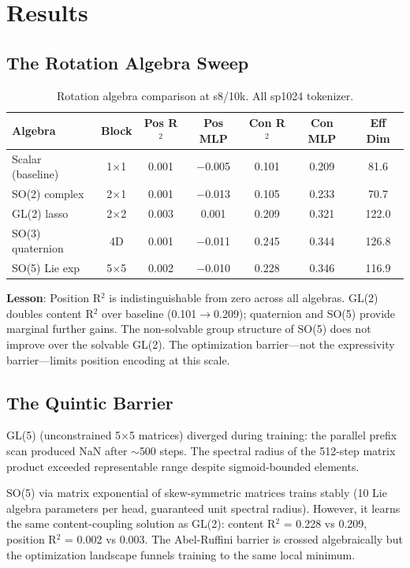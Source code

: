 \documentclass[11pt,a4paper]{article}
\begin{document}
\section{Results}

\subsection{The Rotation Algebra Sweep}

\begin{table}[h]
\centering
\caption{Rotation algebra comparison at s8/10k. All sp1024 tokenizer.}
\begin{tabular}{lcccccc}
\toprule
Algebra & Block & Pos R$^2$ & Pos MLP & Con R$^2$ & Con MLP & Eff Dim \\
\midrule
Scalar (baseline) & 1$\times$1 & 0.001 & $-$0.005 & 0.101 & 0.209 & 81.6 \\
SO(2) complex & 2$\times$1 & 0.001 & $-$0.013 & 0.105 & 0.233 & 70.7 \\
GL(2) lasso & 2$\times$2 & 0.003 & 0.001 & 0.209 & 0.321 & 122.0 \\
SO(3) quaternion & 4D & 0.001 & $-$0.011 & 0.245 & 0.344 & 126.8 \\
SO(5) Lie exp & 5$\times$5 & 0.002 & $-$0.010 & 0.228 & 0.346 & 116.9 \\
\bottomrule
\end{tabular}
\label{tab:algebra}
\end{table}

\textbf{Lesson}: Position R$^2$ is indistinguishable from zero across all algebras. GL(2) doubles content R$^2$ over baseline (0.101$\to$0.209); quaternion and SO(5) provide marginal further gains. The non-solvable group structure of SO(5) does not improve over the solvable GL(2). The optimization barrier---not the expressivity barrier---limits position encoding at this scale.

\subsection{The Quintic Barrier}

GL(5) (unconstrained 5$\times$5 matrices) diverged during training: the parallel prefix scan produced NaN after $\sim$500 steps. The spectral radius of the 512-step matrix product exceeded representable range despite sigmoid-bounded elements.

SO(5) via matrix exponential of skew-symmetric matrices trains stably (10 Lie algebra parameters per head, guaranteed unit spectral radius). However, it learns the same content-coupling solution as GL(2): content R$^2$ = 0.228 vs 0.209, position R$^2$ = 0.002 vs 0.003. The Abel-Ruffini barrier is crossed algebraically but the optimization landscape funnels training to the same local minimum.
\end{document}
